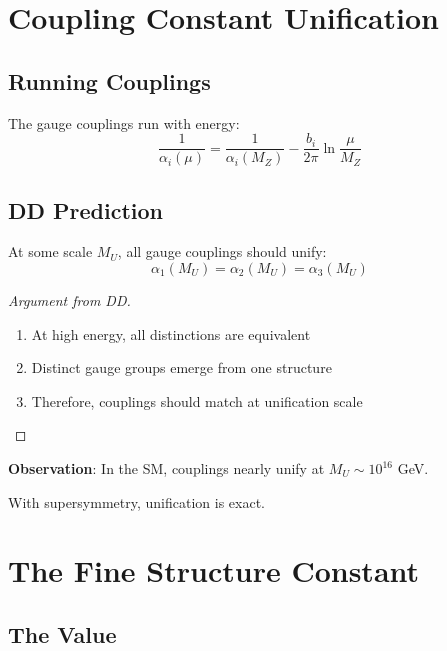 \section{Coupling Constant Unification}

\subsection{Running Couplings}

The gauge couplings run with energy:
\begin{equation}
\frac{1}{\alpha_i(\mu)} = \frac{1}{\alpha_i(M_Z)} - \frac{b_i}{2\pi} \ln\frac{\mu}{M_Z}
\end{equation}

\subsection{DD Prediction}

\begin{theorem}
At some scale $M_U$, all gauge couplings should unify:
\begin{equation}
\alpha_1(M_U) = \alpha_2(M_U) = \alpha_3(M_U)
\end{equation}
\end{theorem}

\begin{proof}[Argument from DD]
\begin{enumerate}
    \item At high energy, all distinctions are equivalent
    \item Distinct gauge groups emerge from one structure
    \item Therefore, couplings should match at unification scale
\end{enumerate}
\end{proof}

\textbf{Observation}: In the SM, couplings nearly unify at $M_U \sim 10^{16}$ GeV.

With supersymmetry, unification is exact.

\section{The Fine Structure Constant}

\subsection{The Value}

